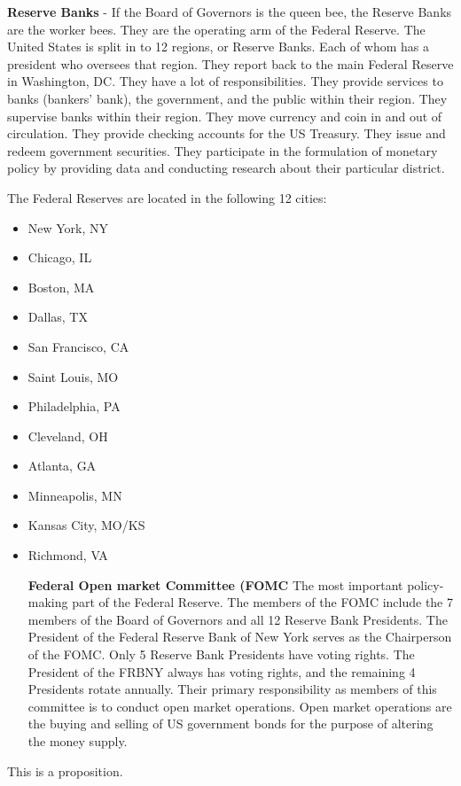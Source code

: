 \documentclass{article}
\begin{document}
\textbf{Reserve Banks} - If the Board of Governors is the queen bee, the Reserve Banks are the worker bees. They are the operating arm of the Federal Reserve. The United States is split in to 12 regions, or Reserve Banks. Each of whom has a president who oversees that region. They report back to the main Federal Reserve in Washington, DC. They have a lot of responsibilities. They provide services to banks (bankers' bank), the government, and the public within their region. They supervise banks within their region. They move currency and coin in and out of circulation. They provide checking accounts for the US Treasury. They issue and redeem government securities. They participate in the formulation of monetary policy by providing data and conducting research about their particular district.

The Federal Reserves are located in the following 12 cities:
\begin{itemize}
    \item{New York, NY}
    \item{Chicago, IL}
    \item{Boston, MA}
    \item{Dallas, TX}
    \item{San Francisco, CA}
    \item{Saint Louis, MO}
    \item{Philadelphia, PA}
    \item{Cleveland,  OH}
    \item{Atlanta, GA}
    \item{Minneapolis, MN}
    \item{Kansas City, MO/KS}
    \item{Richmond, VA}

\textbf{Federal Open market Committee (FOMC}
The most important policy-making part of the Federal Reserve. The members of the FOMC include the 7 members of the Board of Governors and all 12 Reserve Bank Presidents. The President of the Federal Reserve Bank of New York serves as the Chairperson of the FOMC. Only 5 Reserve Bank Presidents have voting rights. The President of the FRBNY always has voting rights, and the remaining 4 Presidents rotate annually. Their primary responsibility as members of this committee is to conduct open market operations. Open market operations are the buying and selling of US government bonds for the purpose of altering the money supply.

\end{itemize}
\begin{proposition}
    This is a proposition.
\end{proposition}
\end{document}
